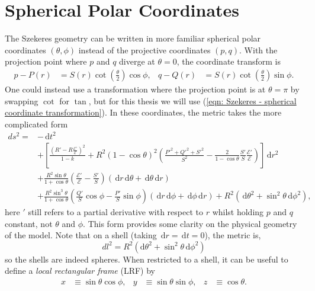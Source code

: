 \documentclass[a4paper,12pt]{report}
\newcommand{\diff}[1]{\,\text{d}{#1}}
\begin{document}
\section{Spherical Polar Coordinates}
The Szekeres geometry can be written in more familiar spherical polar coordinates $(\theta, \phi)$ instead of the projective coordinates $(p,q)$. With the projection point where $p$ and $q$ diverge at $\theta=0$, the coordinate transform is
\begin{align}\label{eqn: Szekeres - spherical coordinate transformation}
  p-P(r)&=S(r)\cot\left(\frac{\theta}{2}\right)\cos\phi, & q-Q(r)&=S(r)\cot\left(\frac{\theta}{2}\right)\sin\phi.
\end{align}
One could instead use a transformation where the projection point is at $\theta=\pi$ by swapping $\cot$ for $\tan$, but for this thesis we will use (\ref{eqn: Szekeres - spherical coordinate transformation}). In these coordinates, the metric takes the more complicated form
\begin{align} \label{eqn: szekeres spherical coords metric}
  ds^2 = &-\diff{t}^2 \\
  &+ \left[\frac{\left(R' - R\frac{\mathcal{E}'}{\mathcal{E}}\right)^2}{1-k} + R^2(1-\cos\theta)^2
  \left(\frac{P'^2 + Q'^2 + S'^2}{S^2} - \frac{2}{1-\cos\theta}\frac{S'}{S}\frac{\mathcal{E}'}{\mathcal{E}}\right)\right]\diff{r}^2 \nonumber\\
  &+ \frac{R^2\sin\theta}{1+\cos\theta}\left(\frac{\mathcal{E}'}{\mathcal{E}} - \frac{S'}{S}\right)\left(\diff{r}\diff{\theta} + \diff{\theta}\diff{r}\right) \nonumber\\
  &+ \frac{R^2 \sin^3\theta}{1+\cos\theta}\left(\frac{Q'}{S}\cos\phi - \frac{P'}{S}\sin\phi\right)\left(\diff{r}\diff{\phi} + \diff{\phi}\diff{r}\right)
  + R^2 \left(\diff{\theta}^2 + \sin^2\theta\diff{\phi}^2\right),
\end{align}
here $'$ still refers to a partial derivative with respect to $r$ whilst holding $p$ and $q$ constant, not $\theta$ and $\phi$. This form provides some clarity on the physical geometry of the model. Note that on a shell (taking $\diff{r}=\diff{t}=0$), the metric is,
\begin{equation}
  dl^2 = R^2 \left(\text{d}\theta^2 + \sin^2\theta\diff{\phi}^2\right)
\end{equation}
so the shells are indeed spheres. When restricted to a shell, it can be useful to define a \textit{local rectangular frame} (LRF) by
\begin{align}\label{eqn: szekeres - LRF definition}
  x &\equiv \sin\theta\cos\phi, & y&\equiv \sin\theta\sin\phi, & z&\equiv\cos\theta.
\end{align}
\end{document}
